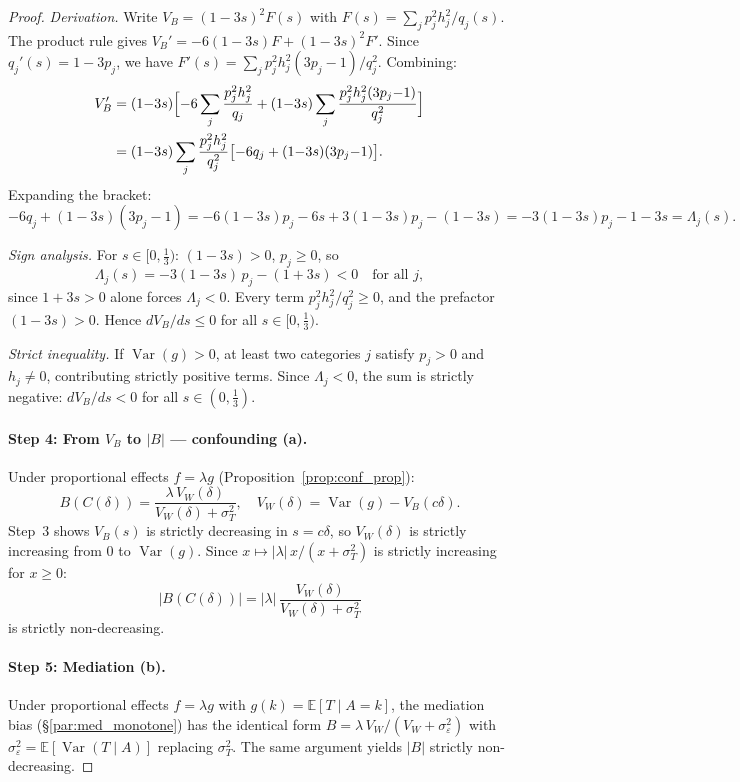 \begin{proof}
\emph{Derivation.}
Write $V_B=(1{-}3s)^2 F(s)$ with $F(s)=\sum_j p_j^2 h_j^2/q_j(s)$.
The product rule gives $V_B'=-6(1{-}3s)F+(1{-}3s)^2 F'$.
Since $q_j'(s)=1{-}3p_j$, we have $F'(s)=\sum_j p_j^2 h_j^2(3p_j{-}1)/q_j^2$.
Combining:
\begin{align*}
  V_B'
  &= (1{-}3s)\Bigl[-6\sum_j \frac{p_j^2 h_j^2}{q_j}+(1{-}3s)\sum_j \frac{p_j^2 h_j^2(3p_j{-}1)}{q_j^2}\Bigr] \\
  &= (1{-}3s)\sum_j \frac{p_j^2 h_j^2}{q_j^2}\bigl[-6q_j+(1{-}3s)(3p_j{-}1)\bigr].
\end{align*}
Expanding the bracket:
\[
  -6q_j+(1{-}3s)(3p_j{-}1)
  = -6(1{-}3s)p_j-6s+3(1{-}3s)p_j-(1{-}3s)
  = -3(1{-}3s)p_j-1-3s
  = \Lambda_j(s).
\]

\emph{Sign analysis.}
For $s\in[0,\tfrac{1}{3})$: $(1{-}3s)>0$, $p_j\geq 0$, so
\[
  \Lambda_j(s) = -3(1{-}3s)\,p_j - (1+3s) < 0
  \quad\text{for all } j,
\]
since $1+3s>0$ alone forces $\Lambda_j<0$.
Every term $p_j^2 h_j^2/q_j^2\geq 0$, and the prefactor $(1{-}3s)>0$.
Hence $dV_B/ds\leq 0$ for all $s\in[0,\tfrac{1}{3})$.

\emph{Strict inequality.}
If $\operatorname{Var}(g){>}0$, at least two categories $j$ satisfy $p_j>0$ and $h_j\neq 0$, contributing strictly positive terms.
Since $\Lambda_j<0$, the sum is strictly negative:
$dV_B/ds<0$ for all $s\in(0,\tfrac{1}{3})$.

\paragraph{Step 4: From $V_B$ to $|B|$ --- confounding (a).}
Under proportional effects $f=\lambda g$ (Proposition~\ref{prop:conf_prop}):
\[
  B(C(\delta)) = \frac{\lambda\,V_W(\delta)}{V_W(\delta)+\sigma_T^2},
  \quad V_W(\delta)=\operatorname{Var}(g)-V_B(c\delta).
\]
Step~3 shows $V_B(s)$ is strictly decreasing in $s=c\delta$, so $V_W(\delta)$ is strictly increasing from $0$ to $\operatorname{Var}(g)$.
Since $x\mapsto |\lambda|\,x/(x+\sigma_T^2)$ is strictly increasing for $x\geq 0$:
\[
  |B(C(\delta))| = |\lambda|\,\frac{V_W(\delta)}{V_W(\delta)+\sigma_T^2}
\]
is strictly non-decreasing.

\paragraph{Step 5: Mediation (b).}
Under proportional effects $f=\lambda g$ with $g(k)=\mathbb{E}[T\mid A{=}k]$, the mediation bias
(§\ref{par:med_monotone}) has the identical form
$B=\lambda\,V_W/(V_W+\sigma_\varepsilon^2)$
with $\sigma_\varepsilon^2=\mathbb{E}[\operatorname{Var}(T\mid A)]$ replacing $\sigma_T^2$.
The same argument yields $|B|$ strictly non-decreasing.


\end{proof}
